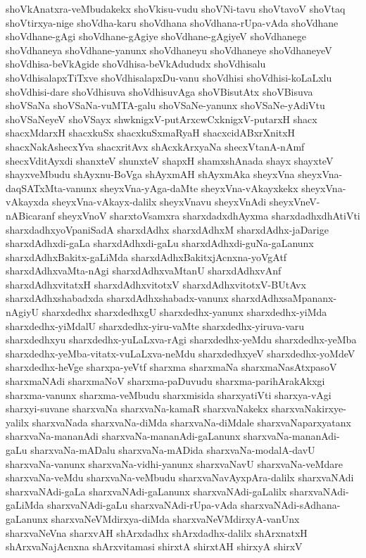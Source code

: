 {shoVkAnatxra-veMbudakekx
shoVkisu-vudu
shoVNi-tavu
shoVtavoV
shoVtaq
shoVtirxya-nige
shoVdha-karu
shoVdhana
shoVdhana-rUpa-vAda
shoVdhane
shoVdhane-gAgi
shoVdhane-gAgiye
shoVdhane-gAgiyeV
shoVdhanege
shoVdhaneya
shoVdhane-yanunx
shoVdhaneyu
shoVdhaneye
shoVdhaneyeV
shoVdhisa-beVkAgide
shoVdhisa-beVkAdududx
shoVdhisalu
shoVdhisalapxTiTxve
shoVdhisalapxDu-vanu
shoVdhisi
shoVdhisi-koLaLxlu
shoVdhisi-dare
shoVdhisuva
shoVdhisuvAga
shoVBisutAtx
shoVBisuva
shoVSaNa
shoVSaNa-vuMTA-galu
shoVSaNe-yanunx
shoVSaNe-yAdiVtu
shoVSaNeyeV
shoVSayx
shwknigxV-putArxcwCxknigxV-putarxH
shacx
shacxMdarxH
shacxkuSx
shacxkuSxmaRyaH
shacxcidABxrXnitxH
shacxNakAshecxYva
shacxritAvx
shAcxkArxyaNa
shecxVtanA-nAmf
shecxVditAyxdi
shanxteV
shunxteV
shapxH
shamxshAnada
shayx
shayxteV
shayxveMbudu
shAyxnu-BoVga
shAyxmAH
shAyxmAka
sheyxVna
sheyxVna-daqSATxMta-vanunx
sheyxVna-yAga-daMte
sheyxVna-vAkayxkekx
sheyxVna-vAkayxda
sheyxVna-vAkayx-dalilx
sheyxVnavu
sheyxVnAdi
sheyxVneV-nABicaranf
sheyxVnoV
sharxtoVsamxra
sharxdadxdhAyxma
sharxdadhxdhAtiVti
sharxdadhxyoVpaniSadA
sharxdAdhx
sharxdAdhxM
sharxdAdhx-jaDarige
sharxdAdhxdi-gaLa
sharxdAdhxdi-gaLu
sharxdAdhxdi-guNa-gaLanunx
sharxdAdhxBakitx-gaLiMda
sharxdAdhxBakitxjAcnxna-yoVgAtf
sharxdAdhxvaMta-nAgi
sharxdAdhxvaMtanU
sharxdAdhxvAnf
sharxdAdhxvitatxH
sharxdAdhxvitotxV
sharxdAdhxvitotxV-BUtAvx
sharxdAdhxshabadxda
sharxdAdhxshabadx-vanunx
sharxdAdhxsaMpananx-nAgiyU
sharxdedhx
sharxdedhxgU
sharxdedhx-yanunx
sharxdedhx-yiMda
sharxdedhx-yiMdalU
sharxdedhx-yiru-vaMte
sharxdedhx-yiruva-varu
sharxdedhxyu
sharxdedhx-yuLaLxva-rAgi
sharxdedhx-yeMdu
sharxdedhx-yeMba
sharxdedhx-yeMba-vitatx-vuLaLxva-neMdu
sharxdedhxyeV
sharxdedhx-yoMdeV
sharxdedhx-heVge
sharxpa-yeVtf
sharxma
sharxmaNa
sharxmaNasAtxpasoV
sharxmaNAdi
sharxmaNoV
sharxma-paDuvudu
sharxma-parihArakAkxgi
sharxma-vanunx
sharxma-veMbudu
sharxmisida
sharxyatiVti
sharxya-vAgi
sharxyi-suvane
sharxvaNa
sharxvaNa-kamaR
sharxvaNakekx
sharxvaNakirxye-yalilx
sharxvaNada
sharxvaNa-diMda
sharxvaNa-diMdale
sharxvaNaparxyatanx
sharxvaNa-mananAdi
sharxvaNa-mananAdi-gaLanunx
sharxvaNa-mananAdi-gaLu
sharxvaNa-mADalu
sharxvaNa-mADida
sharxvaNa-modalA-davU
sharxvaNa-vanunx
sharxvaNa-vidhi-yanunx
sharxvaNavU
sharxvaNa-veMdare
sharxvaNa-veMdu
sharxvaNa-veMbudu
sharxvaNavAyxpAra-dalilx
sharxvaNAdi
sharxvaNAdi-gaLa
sharxvaNAdi-gaLanunx
sharxvaNAdi-gaLalilx
sharxvaNAdi-gaLiMda
sharxvaNAdi-gaLu
sharxvaNAdi-rUpa-vAda
sharxvaNAdi-sAdhana-gaLanunx
sharxvaNeVMdirxya-diMda
sharxvaNeVMdirxyA-vanUnx
sharxvaNeVna
sharxvAH
shArxdadhx
shArxdadhx-dalilx
shArxnatxH
shArxvaNajAcnxna
shArxvitamasi
shirxtA
shirxtAH
shirxyA
shirxV
}
